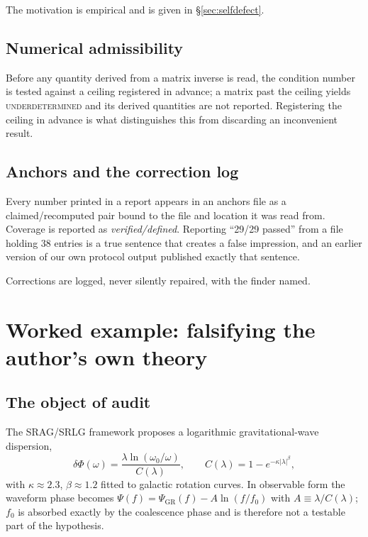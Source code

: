 \documentclass[11pt,a4paper]{article}
\newcommand{\verdict}[1]{\textsc{#1}}
\begin{document}
The motivation is empirical and is given in \S\ref{sec:selfdefect}.

\subsection{Numerical admissibility}

Before any quantity derived from a matrix inverse is read, the condition number
is tested against a ceiling registered in advance; a matrix past the ceiling
yields \verdict{underdetermined} and its derived quantities are not reported.
Registering the ceiling in advance is what distinguishes this from discarding
an inconvenient result.

\subsection{Anchors and the correction log}

Every number printed in a report appears in an anchors file as a
claimed/recomputed pair bound to the file and location it was read from.
Coverage is reported as \emph{verified/defined}. Reporting ``29/29 passed''
from a file holding 38 entries is a true sentence that creates a false
impression, and an earlier version of our own protocol output published exactly that sentence.

Corrections are logged, never silently repaired, with the finder named.

\section{Worked example: falsifying the author's own theory}
\label{sec:gw}

\subsection{The object of audit}

The SRAG/SRLG framework proposes a logarithmic gravitational-wave dispersion,
\begin{equation}
\delta\Phi(\omega) = \frac{\lambda \ln(\omega_0/\omega)}{C(\lambda)},
\qquad C(\lambda) = 1 - e^{-\kappa|\lambda|^\beta},
\end{equation}
with $\kappa \approx 2.3$, $\beta \approx 1.2$ fitted to galactic rotation
curves. In observable form the waveform phase becomes
$\Psi(f) = \Psi_{\mathrm{GR}}(f) - A\ln(f/f_0)$ with $A \equiv \lambda/C(\lambda)$;
$f_0$ is absorbed exactly by the coalescence phase and is therefore not a
testable part of the hypothesis.
\end{document}
